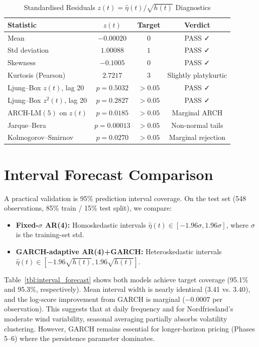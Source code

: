 \documentclass[11pt, a4paper, twoside]{article}
\begin{document}
\begin{table}[ht]
\centering
\caption{Standardised Residuals $z(t) = \hat{\eta}(t) / \sqrt{h(t)}$ Diagnostics}
\label{tbl:z_diagnostics}
\small
\begin{tabularx}{0.85\textwidth}{l|cc|c}
\toprule
\textbf{Statistic} & $z(t)$ & Target & \textbf{Verdict} \\
\midrule
Mean & $-0.00020$ & $0$ & PASS ✓ \\
Std deviation & $1.00088$ & $1$ & PASS ✓ \\
Skewness & $-0.1005$ & $0$ & PASS ✓ \\
Kurtosis (Pearson) & $2.7217$ & $3$ & Slightly platykurtic \\
\midrule
Ljung--Box $z(t)$, lag 20 & $p = 0.5032$ & $> 0.05$ & PASS ✓ \\
Ljung--Box $z^2(t)$, lag 20 & $p = 0.2827$ & $> 0.05$ & PASS ✓ \\
ARCH-LM$(5)$ on $z(t)$ & $p = 0.0185$ & $> 0.05$ & Marginal ARCH \\
Jarque--Bera & $p = 0.00013$ & $> 0.05$ & Non-normal tails \\
Kolmogorov--Smirnov & $p = 0.0270$ & $> 0.05$ & Marginal rejection \\
\bottomrule
\end{tabularx}
\end{table}

\section{Interval Forecast Comparison}

A practical validation is 95\% prediction interval coverage. On the test set (548 observations, 85\% train / 15\% test split), we compare:
\begin{itemize}
\item \textbf{Fixed-$\sigma$ AR(4):} Homoskedastic intervals $\hat{\eta}(t) \in [-1.96\sigma, 1.96\sigma]$, where $\sigma$ is the training-set std.
\item \textbf{GARCH-adaptive AR(4)+GARCH:} Heteroskedastic intervals $\hat{\eta}(t) \in [-1.96\sqrt{h(t)}, 1.96\sqrt{h(t)}]$.
\end{itemize}

Table~\ref{tbl:interval_forecast} shows both models achieve target coverage (95.1\% and 95.3\%, respectively). Mean interval width is nearly identical (3.41 vs. 3.40), and the log-score improvement from GARCH is marginal ($-0.0007$ per observation). This suggests that at daily frequency and for Nordfriesland's moderate wind variability, seasonal averaging partially absorbs volatility clustering. However, GARCH remains essential for longer-horizon pricing (Phases 5--6) where the persistence parameter dominates.
\end{document}
